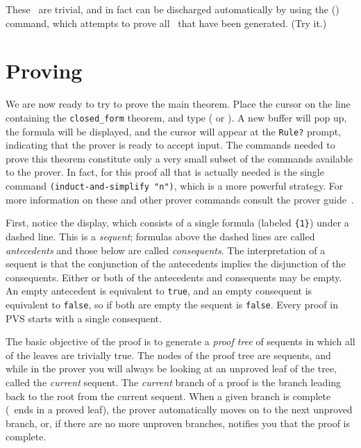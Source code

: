 These \tccs\ are trivial, and in fact can be discharged automatically by
using the  () command, which attempts to
prove all \tccs\ that have been generated.  (Try it.)

\section{Proving}

We are now ready to try to prove the main theorem.  Place the cursor on
the line containing the \texttt{closed\_form} theorem, and type
 ( or ).  A new buffer will pop up, the
formula will be displayed, and the cursor will appear at the
\texttt{Rule?}  prompt, indicating that the prover is ready to accept
input.  The commands needed to prove this theorem constitute only a very
small subset of the commands available to the prover.  In fact, for this
proof all that is actually needed is the single command
\texttt{(induct-and-simplify "n")}, which is a more powerful strategy.
For more information on these and other prover commands consult the prover
guide~\cite{PVS:prover}.

First, notice the display, which consists of a single formula (labeled
\texttt{\{1\}}) under a dashed line.  This is a
\emph{sequent}; formulas above the dashed lines are called
\emph{antecedents} and those below are called
\emph{consequents}.  The interpretation of a sequent is
that the conjunction of the antecedents implies the disjunction of the
consequents.  Either or both of the antecedents and consequents may be
empty.  An empty antecedent is equivalent to \texttt{true}, and an empty
consequent is equivalent to \texttt{false}, so if both are empty the
sequent is \texttt{false}.  Every proof in PVS starts with a single
consequent.

The basic objective of the proof is to generate a \emph{proof
tree} of sequents in which all of the leaves are
trivially true.  The nodes of the proof tree are sequents, and while in
the prover you will always be looking at an unproved leaf of the tree,
called the \emph{current} sequent. The
\emph{current} branch of a proof is the branch
leading back to the root from the current sequent.  When a given branch is
complete (\ie\ ends in a proved leaf), the prover automatically moves on
to the next unproved branch, or, if there are no more unproven branches,
notifies you that the proof is complete.

